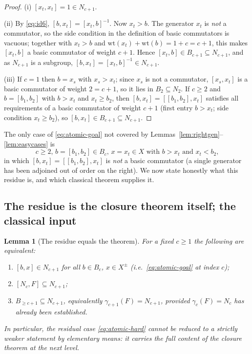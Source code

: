 \documentclass{amsart}
\newtheorem{lemma}{Lemma}
\theoremstyle{definition}
\theoremstyle{remark}
\begin{document}
\begin{proof}
(i) $[x_t,x_t]=1\in N_{c+1}$.

\smallskip
(ii) By \eqref{eq:id6}, $[b,x_t]=[x_t,b]^{-1}$. Now $x_t>b$. The generator $x_t$ is
\emph{not} a commutator, so the side condition in the definition of basic
commutators is vacuous; together with $x_t>b$ and
$\mathrm{wt}(x_t)+\mathrm{wt}(b)=1+c=c+1$, this makes $[x_t,b]$ a basic commutator
of weight $c+1$. Hence $[x_t,b]\in B_{c+1}\subseteq N_{c+1}$, and as $N_{c+1}$ is a
subgroup, $[b,x_t]=[x_t,b]^{-1}\in N_{c+1}$.

\smallskip
(iii) If $c=1$ then $b=x_s$ with $x_s>x_t$; since $x_s$ is not a commutator,
$[x_s,x_t]$ is a basic commutator of weight $2=c+1$, so it lies in $B_2\subseteq
N_2$. If $c\ge2$ and $b=[b_1,b_2]$ with $b>x_t$ and $x_t\ge b_2$, then
$[b,x_t]=[[b_1,b_2],x_t]$ satisfies all requirements of a basic commutator of
weight $c+1$ (first entry $b>x_t$; side condition $x_t\ge b_2$), so
$[b,x_t]\in B_{c+1}\subseteq N_{c+1}$.
\end{proof}

The only case of \eqref{eq:atomic-goal} not covered by
Lemmas~\ref{lem:rightgen}--\ref{lem:easycases} is
\begin{equation}\label{eq:atomic-hard}
\text{$c\ge2$, $b=[b_1,b_2]\in B_c$, $x=x_t\in X$ with $b>x_t$ and $x_t<b_2$,}
\end{equation}
in which $[b,x_t]=[[b_1,b_2],x_t]$ is \emph{not} a basic commutator (a single
generator has been adjoined out of order on the right). We now state honestly what
this residue is, and which classical theorem supplies it.

\subsection{The residue is the closure theorem itself; the classical input}

\begin{lemma}[The residue equals the theorem]\label{lem:residue-eq}
For a fixed $c\ge1$ the following are equivalent:
\begin{enumerate}
\item[(a)] $[b,x]\in N_{c+1}$ for all $b\in B_c$, $x\in X^{\pm}$ \emph{(i.e.\
\eqref{eq:atomic-goal} at index $c$)};
\item[(b)] $[N_c,F]\subseteq N_{c+1}$;
\item[(c)] $B_{\ge c+1}\subseteq N_{c+1}$, equivalently $\gamma_{c+1}(F)=N_{c+1}$,
provided $\gamma_c(F)=N_c$ has already been established.
\end{enumerate}
In particular, the residual case \eqref{eq:atomic-hard} cannot be reduced to a
\emph{strictly weaker} statement by elementary means: it carries the full content
of the closure theorem at the next level.
\end{lemma}
\end{document}
